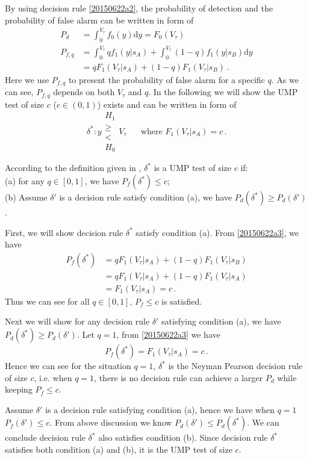 By using decision rule \eqref{20150622a2}, the probability of detection and the probability of false alarm can be written in form of 
\begin{equation}
  \begin{split}
  P_d &= \int_{0}^{V_\tau} f_0(y) \mathrm{d}y = F_0(V_\tau)\\
  P_{f,q} &= \int_{0}^{V_\tau} qf_1(y|s_A) + \int_0^{V_\tau}(1-q)f_1(y|s_B)\mathrm{d}y\\
      &= qF_1(V_\tau|s_A) + (1-q)F_1(V_\tau|s_B)\,.
    \end{split}
    \label{20150622a3}
  \end{equation}
  Here we use $P_{f,q}$ to present the probability of false alarm for a specific $q$.
  As we can see,  $P_{f,q}$ depends on both $V_\tau$ and $q$.   
In the following we will show the UMP test of size $c$ ($c \in (0, 1)$) exists and can be written in form of 
\begin{equation}
\delta^\ast:  y \substack{H_1 \\ \geq \\ < \\ H_0} V_\tau\;\;\;\;\;\;\text{where $F_1(V_\tau|s_A) = c$}\,.
\end{equation}

According to the definition given in \cite{LehmannTest},  $\delta^\ast$ is a UMP test of size $c$ if:
\\(a) for any $q \in [0, 1]$, we have $P_f(\delta^\ast) \leq c$;
\\(b) Assume $\delta'$ is a decision rule satisfy condition (a), we have $P_d(\delta^\ast) \geq P_d(\delta')$.  

First, we will show decision rule $\delta^\ast$ satisfy condition (a). From \eqref{20150622a3}, we have 
\begin{equation}
  \begin{split}
    P_f(\delta^\ast) &= qF_1(V_\tau|s_A) + (1-q)F_1(V_\tau|s_B)\\
    &= qF_1(V_\tau|s_A) + (1-q)F_1(V_\tau|s_A)\\
    &= F_1(V_\tau|s_A) = c\,.
  \end{split}
\end{equation}
Thus we can see for all $q \in [0, 1]$, $P_f \leq c$ is satisfied.

Next we will show for any decision rule $\delta'$ satisfying condition (a), we have $P_d(\delta^\ast) \geq P_d(\delta')$.  
Let $q = 1$, from \eqref{20150622a3} we have 
\begin{equation}
  P_f(\delta^\ast) = F_1(V_\tau|s_A) = c\,.
\end{equation}
Hence we can see for the situation $q=1$,  $\delta^\ast$ is the Neyman Pearson decision rule of size $c$, i.e. when $q=1$, there is no decision rule can achieve a larger $P_d$ while keeping $P_f \leq c$.  

Assume $\delta'$ is a decision rule satisfying condition (a), hence we have when $q = 1$ $P_f(\delta') \leq c$. From above discussion we know $P_d(\delta') \leq P_d(\delta^\ast)$. We can conclude decision rule $\delta^\ast$ also satisfies condition (b). Since decision rule $\delta^\ast$ satisfies both condition (a) and (b), it is the UMP test of size $c$.    
